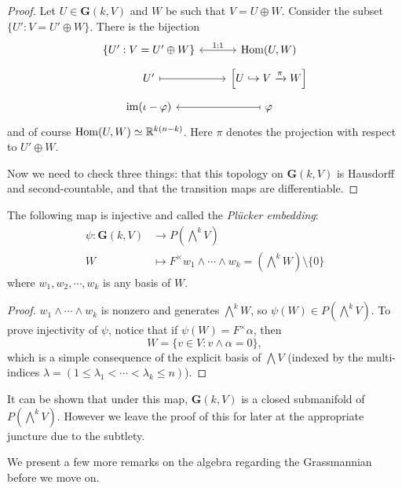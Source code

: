 \begin{proof}
    Let $U\in\mathbf{G}(k,V)$ and $W$ be such that $V=U\oplus W$. Consider the subset $\{U':V=U'\oplus W\}$. There is the bijection
    \[\begin{tikzcd}[row sep=tiny]
        \{U':V=U'\oplus W\} \arrow[r, leftrightarrow, "1:1"] & \operatorname{Hom}(U,W) \\
        U' \arrow[r, mapsto] & \left [U\hookrightarrow V\xrightarrow{\pi}W\right ] \\
        \operatorname{im}(\iota-\varphi) \arrow[r, mapsfrom] & \varphi
    \end{tikzcd}\]
    and of course $\operatorname{Hom}(U,W)\simeq\mathbb{R}^{k(n-k)}$. Here $\pi$ denotes the projection with respect to $U'\oplus W$.

    Now we need to check three things: that this topology on $\mathbf{G}(k,V)$ is Hausdorff and second-countable, and that the transition maps are differentiable.

\end{proof}

\begin{theorem}
    The following map is injective and called the \emph{Plücker embedding}:
    \begin{align*}
        \psi:\mathbf{G}(k,V) &\longrightarrow P(\bigwedge^kV) \\
        W &\longmapsto F^\times w_1\wedge\cdots\wedge w_k=(\bigwedge^kW)\setminus\{0\}
    \end{align*}
    where $w_1,w_2,\cdots,w_k$ is any basis of $W$.
\end{theorem}

\begin{proof}
    $w_1\wedge\cdots\wedge w_k$ is nonzero and generates $\bigwedge^kW$, so $\psi(W)\in P(\bigwedge^kV)$. To prove injectivity of $\psi$, notice that if $\psi(W)=F^\times\alpha$, then
    $$W=\{v\in V:v\wedge\alpha=0\},$$
    which is a simple consequence of the explicit basis of $\bigwedge V$ (indexed by the multi-indices $\lambda=(1\leq\lambda_1<\cdots<\lambda_k\leq n)$).
\end{proof}

It can be shown that under this map, $\mathbf{G}(k,V)$ is a closed submanifold of $P(\bigwedge^kV)$. However we leave the proof of this for later at the appropriate juncture due to the subtlety.

We present a few more remarks on the algebra regarding the Grassmannian before we move on. %

